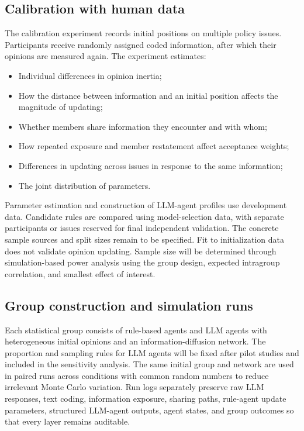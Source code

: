 \documentclass[11pt,a4paper]{article}
\begin{document}
\subsection{Calibration with human data}

The calibration experiment records initial positions on multiple policy issues. Participants receive randomly assigned coded information, after which their opinions are measured again. The experiment estimates:

\begin{itemize}
\item Individual differences in opinion inertia;
\item How the distance between information and an initial position affects the magnitude of updating;
\item Whether members share information they encounter and with whom;
\item How repeated exposure and member restatement affect acceptance weights;
\item Differences in updating across issues in response to the same information;
\item The joint distribution of parameters.
\end{itemize}

Parameter estimation and construction of LLM-agent profiles use development data. Candidate rules are compared using model-selection data, with separate participants or issues reserved for final independent validation. The concrete sample sources and split sizes remain to be specified. Fit to initialization data does not validate opinion updating. Sample size will be determined through simulation-based power analysis using the group design, expected intragroup correlation, and smallest effect of interest.

\subsection{Group construction and simulation runs}

Each statistical group consists of rule-based agents and LLM agents with heterogeneous initial opinions and an information-diffusion network. The proportion and sampling rules for LLM agents will be fixed after pilot studies and included in the sensitivity analysis. The same initial group and network are used in paired runs across conditions with common random numbers to reduce irrelevant Monte Carlo variation. Run logs separately preserve raw LLM responses, text coding, information exposure, sharing paths, rule-agent update parameters, structured LLM-agent outputs, agent states, and group outcomes so that every layer remains auditable.
\end{document}
